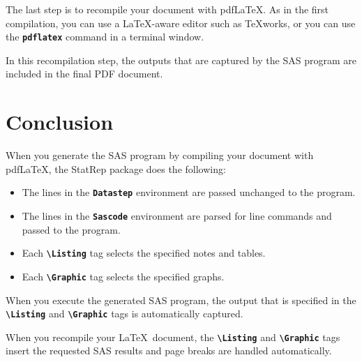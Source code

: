 \documentclass{article}
\newcommand*{\Statrep}{\mbox{\textsf{StatRep}}\xspace}
\newcommand*{\Code}[1]{\texttt{\textbf{#1}}}
\newcommand*{\cs}[1]{\texttt{\textbf{\textbackslash#1}}}
\begin{document}
The last step is to recompile your document with pdf\LaTeX.
As in the first compilation, you can use a \LaTeX-aware editor such
as \TeX works, or you can use the \Code{pdflatex} command in a terminal window.

In this recompilation step, the outputs that are captured by the SAS program
are included in the final PDF document.

\section{Conclusion}

When you generate
the SAS program by compiling your document with pdf\LaTeX,
the \Statrep package does the following:
\begin{itemize}
\item The lines in the \Code{Datastep} environment are passed unchanged to the program.
\item The lines in the \Code{Sascode} environment are parsed for line commands and passed
to the program.
\item Each \cs{Listing} tag  selects the specified notes and tables.

\item Each \cs{Graphic} tag selects the specified graphs.

\end{itemize}

When you execute the generated SAS program, the output that is
specified in the \cs{Listing} and \cs{Graphic}
tags is automatically captured.

When you recompile your \LaTeX\ document, the \cs{Listing} and \cs{Graphic} tags
insert the requested SAS results and page breaks are handled automatically.
\end{document}
